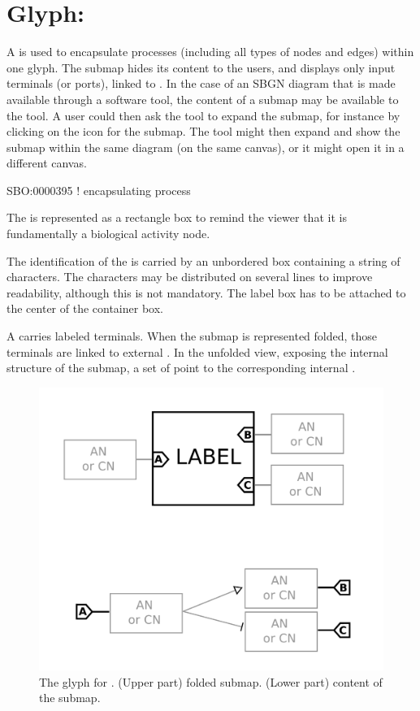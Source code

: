 \section{Glyph: }
\label{sec:submap}

A  is used to encapsulate processes (including all types of nodes and edges) within one glyph.  The submap hides its content to the users, and displays only input terminals (or ports), linked to . In the case of an SBGN diagram that is made available through a software tool, the content of a submap may be available to the tool.  A user could then ask the tool to expand the submap, for instance by clicking on the icon for the submap.  The tool might then expand and show the submap within the same diagram (on the same canvas), or it might open it in a different canvas.

\begin{glyphDescription}

\glyphSboTerm SBO:0000395 ! encapsulating process

\glyphContainer The  is represented as a rectangle box to remind the viewer that it is fundamentally a biological activity node.

\glyphLabel The identification of the  is carried by an unbordered box containing a string of characters.  The characters may be distributed on several lines to improve readability, although this is not mandatory.  The label box has to be attached to the center of the container box.

\glyphAux A  carries labeled terminals.  When the submap is represented folded, those terminals are linked to external .  In the unfolded view, exposing the internal structure of the submap, a set of  point to the corresponding internal .

\end{glyphDescription}

\begin{figure}[H]
  \centering
  \includegraphics[scale = 0.22]{images/submap}
  \caption{The \AF glyph for . (Upper part) folded submap. (Lower part) content of the submap.}
  \label{fig:submap}
\end{figure}

